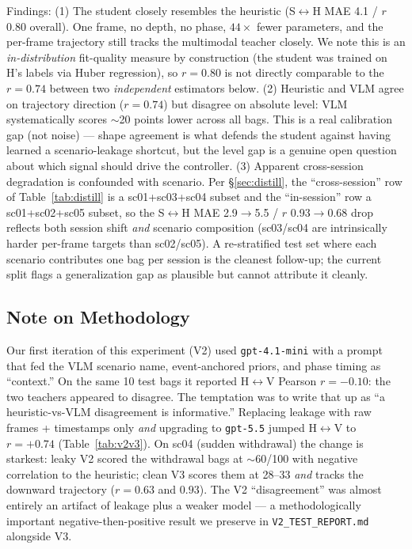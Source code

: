 \documentclass{article}
\newcommand{\code}[1]{\texttt{\small #1}}
\begin{document}
Findings: (1) The student closely resembles the heuristic (S$\leftrightarrow$H MAE 4.1 / $r$ 0.80 overall). One frame, no depth, no phase, $44\times$ fewer parameters, and the per-frame trajectory still tracks the multimodal teacher closely. We note this is an \emph{in-distribution} fit-quality measure by construction (the student was trained on H's labels via Huber regression), so $r=0.80$ is not directly comparable to the $r=0.74$ between two \emph{independent} estimators below. (2) Heuristic and VLM agree on trajectory direction ($r = 0.74$) but disagree on absolute level: VLM systematically scores $\sim$20 points lower across all bags. This is a real calibration gap (not noise) --- shape agreement is what defends the student against having learned a scenario-leakage shortcut, but the level gap is a genuine open question about which signal should drive the controller. (3) Apparent cross-session degradation is confounded with scenario. Per \S\ref{sec:distill}, the ``cross-session'' row of Table~\ref{tab:distill} is a sc01+sc03+sc04 subset and the ``in-session'' row a sc01+sc02+sc05 subset, so the S$\leftrightarrow$H MAE 2.9$\to$5.5 / $r$ 0.93$\to$0.68 drop reflects both session shift \emph{and} scenario composition (sc03/sc04 are intrinsically harder per-frame targets than sc02/sc05). A re-stratified test set where each scenario contributes one bag per session is the cleanest follow-up; the current split flags a generalization gap as plausible but cannot attribute it cleanly.

\subsection{Note on Methodology}

Our first iteration of this experiment (V2) used \code{gpt-4.1-mini} with a prompt that fed the VLM scenario name, event-anchored priors, and phase timing as ``context.'' On the same 10 test bags it reported H$\leftrightarrow$V Pearson $r = -0.10$: the two teachers appeared to disagree. The temptation was to write that up as ``a heuristic-vs-VLM disagreement is informative.'' Replacing leakage with raw frames + timestamps only \emph{and} upgrading to \code{gpt-5.5} jumped H$\leftrightarrow$V to $r = +0.74$ (Table~\ref{tab:v2v3}). On sc04 (sudden withdrawal) the change is starkest: leaky V2 scored the withdrawal bags at $\sim$60/100 with negative correlation to the heuristic; clean V3 scores them at 28--33 \emph{and} tracks the downward trajectory ($r = 0.63$ and $0.93$). The V2 ``disagreement'' was almost entirely an artifact of leakage plus a weaker model --- a methodologically important negative-then-positive result we preserve in \code{V2\_TEST\_REPORT.md} alongside V3.
\end{document}

